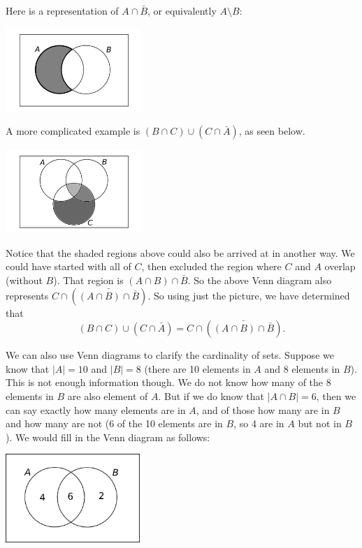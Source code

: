\documentclass[12pt]{article}
\begin{document}
Here is a representation of $A \cap \bar B$, or equivalently $A \setminus B$:

\begin{center}
 \includegraphics[width=2in]{images/venn2AcapbarB.png}
\end{center}



A more complicated example is $(B \cap C) \cup (C \cap \bar A)$, as seen below.

\begin{center}
 \includegraphics[width=2in]{images/venn3complex.png}
\end{center}

Notice that the shaded regions above could also be arrived at in another way.  We could have started with all of $C$, then excluded the region where $C$ and $A$ overlap (without $B$).  That region is $(A \cap B) \cap \bar B$.  So the above Venn diagram also represents $C \cap \left(\bar{(A\cap B)\cap \bar B}\right).$  So using just the picture, we have determined that
\[ (B \cap C) \cup (C \cap \bar A) = C \cap \left(\bar{(A\cap B)\cap \bar B}\right).\]


We can also use Venn diagrams to clarify the cardinality of sets.  Suppose we know that $|A| = 10$ and $|B| = 8$ (there are 10 elements in $A$ and 8 elements in $B$).  This is not enough information though.  We do not know how many of the 8 elements in $B$ are also element of $A$.  But if we do know that $|A \cap B| = 6$, then we can say exactly how many elements are in $A$, and of those how many are in $B$ and how many are not (6 of the 10 elements are in $B$, so 4 are in $A$ but not in $B$).  We would fill in the Venn diagram as follows:

\begin{center}
 \includegraphics[width=2in]{images/venn2card.png}
\end{center}
\end{document}
